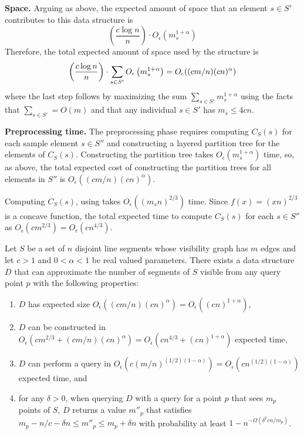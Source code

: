 \documentclass{patmorin}
\newcommand{\Oe}{O_\epsilon}
\begin{document}
\noindent\textbf{Space.} 
Arguing as above, the expected amount of space that an element $s\in S'$
contributes to this data structure is
\[
    \left(\frac{c\log n}{n}\right)\cdot \Oe\left(m_s^{1+\alpha}\right)
\]
Therefore, the total expected amount of space used by the structure is
\begin{equation}
    \left(\frac{c\log n}{n}\right)\cdot \sum_{s\in S'}\Oe\left(m_s^{1+\alpha}\right)
     = \Oe((cm/n)(cn)^\alpha) \eqlabel{space-convex}
\end{equation}
where the last step follows by maximizing the sum $\sum_{s\in
S'}m_s^{1+\alpha}$ using the facts that $\sum_{s\in S'} = O(m)$ and that
any individual $s\in S'$ has $m_s \le 4cn$.

\noindent\textbf{Preprocessing time.} 
The preprocessing phase requires computing $C_S(s)$ for each sample element
$s\in S''$ and constructing a layered partition tree for the elements of
$C_S(s)$.  Constructing the partition tree takes $\Oe(m_s^{1+\alpha})$
time, so, as above, the total expected cost of constructing the partition
trees for all elements in $S''$ is $\Oe((cm/n)(cn)^\alpha)$.

Computing $C_S(s)$, using  takes
$\Oe((m_sn)^{2/3})$ time. Since $f(x) = (xn)^{2/3}$ is a concave function,
the total expected time to compute $C_S(s)$ for each $s\in S''$ as
$\Oe(cm^{2/3})=\Oe(cn^{4/3})$.

\begin{thm}
  Let $S$ be a set of $n$ disjoint line segments whose visibility
  graph has $m$ edges and let $c>1$ and $0 < \alpha < 1$ be real valued
  parameters.  There exists a data structure $D$ that can approximate
  the number of segments of $S$ visible from any query point $p$ with
  the following properties:
  \begin{enumerate}
    \item $D$ has expected size $\Oe((cm/n)(cn)^{\alpha}) =
          \Oe((cn)^{1+\alpha})$,
    \item $D$ can be constructed in 
          $\Oe(cm^{2/3} + (cm/n)(cn)^{\alpha}) = \Oe(cn^{4/3} + (cn)^{1+\alpha})$
          expected time,
    \item $D$ can perform a query in $\Oe(c(m/n)^{(1/2)(1-\alpha)}) =
          \Oe(cn^{(1/2)(1-\alpha)})$ expected time, and
    \item for any $\delta > 0$, when querying $D$ with a query for a
          point $p$ that sees $m_p$ points of $S$, $D$ returns a value
          $m''_p$ that satisfies $m_p - n/c - \delta n \le m''_p \le m_p
          + \delta n$ with probability at least $1-n^{-\Omega(\delta^2
          cn/m_p)}$.
  \end{enumerate}
\end{thm}
\end{document}

